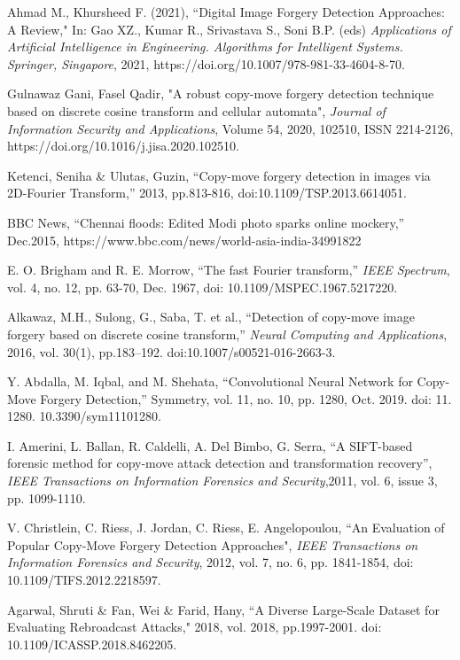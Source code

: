 \documentclass[conference]{IEEEtran}
\begin{document}
\begin{thebibliography}{00}Ahmad M., Khursheed F. (2021), “Digital Image Forgery Detection Approaches: A Review," In: Gao XZ., Kumar R., Srivastava S., Soni B.P. (eds)\textit{ Applications of Artificial Intelligence in Engineering. Algorithms for Intelligent Systems. Springer, Singapore}, 2021,  https://doi.org/10.1007/978-981-33-4604-8-70.

Gulnawaz Gani, Fasel Qadir, "A robust copy-move forgery detection technique based on discrete cosine transform and cellular automata",\textit{ Journal of Information Security and Applications}, Volume 54, 2020, 102510, ISSN 2214-2126, https://doi.org/10.1016/j.jisa.2020.102510.

Ketenci, Seniha \& Ulutas, Guzin, “Copy-move forgery detection in images via 2D-Fourier Transform,” 2013, pp.813-816, doi:10.1109/TSP.2013.6614051. 

BBC News, “Chennai floods: Edited Modi photo sparks online mockery,” Dec.2015, https://www.bbc.com/news/world-asia-india-34991822 

E. O. Brigham and R. E. Morrow, “The fast Fourier transform,”  \textit{IEEE Spectrum}, vol. 4, no. 12, pp. 63-70, Dec. 1967, doi: 10.1109/MSPEC.1967.5217220.

Alkawaz, M.H., Sulong, G., Saba, T. et al., “Detection of copy-move image forgery based on discrete cosine transform,”\textit{ Neural Computing and Applications}, 2016, vol. 30(1), pp.183–192. doi:10.1007/s00521-016-2663-3.

Y. Abdalla, M. Iqbal, and M. Shehata, “Convolutional Neural Network for Copy-Move Forgery Detection,” Symmetry, vol. 11, no. 10, pp. 1280, Oct. 2019. doi: 11. 1280. 10.3390/sym11101280.

 I. Amerini, L. Ballan, R. Caldelli, A. Del Bimbo, G. Serra, 
“A SIFT-based forensic method for copy-move attack detection and transformation recovery”, \textit{IEEE Transactions on Information Forensics and Security},2011, vol. 6, issue 3, pp. 1099-1110. 

V. Christlein, C. Riess, J. Jordan, C. Riess, E. Angelopoulou, “An Evaluation of Popular Copy-Move Forgery Detection Approaches", 
\textit{IEEE Transactions on Information Forensics and Security}, 2012, vol. 7, no. 6, pp. 1841-1854,  doi: 10.1109/TIFS.2012.2218597.

Agarwal, Shruti \& Fan, Wei \& Farid, Hany, “A Diverse Large-Scale Dataset for Evaluating Rebroadcast Attacks," 2018, vol. 2018, pp.1997-2001. doi: 10.1109/ICASSP.2018.8462205.


\end{thebibliography}
\end{document}
